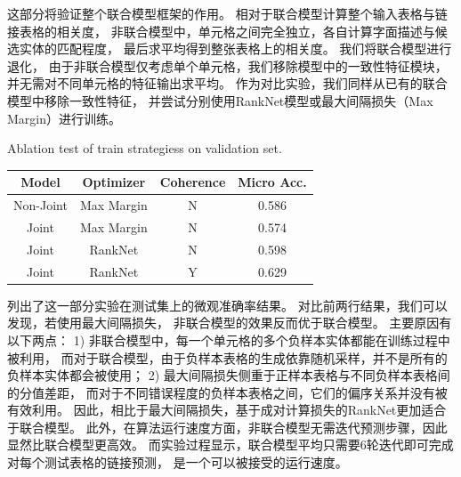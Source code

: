这部分将验证整个联合模型框架的作用。
相对于联合模型计算整个输入表格与链接表格的相关度，
非联合模型中，单元格之间完全独立，各自计算字面描述与候选实体的匹配程度，
最后求平均得到整张表格上的相关度。
我们将联合模型进行退化，
由于非联合模型仅考虑单个单元格，我们移除模型中的一致性特征模块，
并无需对不同单元格的特征输出求平均。
%
作为对比实验，我们同样从已有的联合模型中移除一致性特征，
并尝试分别使用RankNet模型或最大间隔损失（Max Margin）进行训练。

\begin{table}[ht]
    \centering
    {Ablation test of train strategiess on validation set.}
    \label{tab:ablation-joint}
    \begin{tabular} {c|c|c|c}
        \hline
        Model       & Optimizer     & Coherence  &  Micro Acc.   \\
        \hline
        Non-Joint   & Max Margin    & N     & 0.586         \\
        Joint       & Max Margin    & N     & 0.574         \\
        Joint       & RankNet       & N     & 0.598         \\
        Joint       & RankNet       & Y     & 0.629         \\
        \hline
    \end{tabular}
\end{table}

列出了这一部分实验在测试集上的微观准确率结果。
对比前两行结果，我们可以发现，若使用最大间隔损失，
非联合模型的效果反而优于联合模型。
主要原因有以下两点：
1) 非联合模型中，每一个单元格的多个负样本实体都能在训练过程中被利用，
而对于联合模型，由于负样本表格的生成依靠随机采样，并不是所有的负样本实体都会被使用；
2) 最大间隔损失侧重于正样本表格与不同负样本表格间的分值差距，
而对于不同错误程度的负样本表格之间，它们的偏序关系并没有被有效利用。
因此，相比于最大间隔损失，基于成对计算损失的RankNet更加适合于联合模型。
此外，在算法运行速度方面，非联合模型无需迭代预测步骤，因此显然比联合模型更高效。
而实验过程显示，联合模型平均只需要6轮迭代即可完成对每个测试表格的链接预测，
是一个可以被接受的运行速度。

